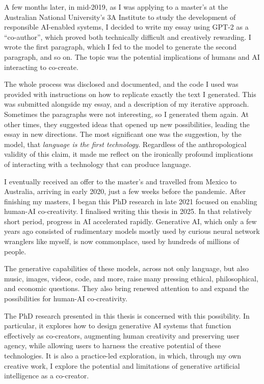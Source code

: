A few months later, in mid-2019, as I was applying to a master's at the Australian National University's 3A Institute to study the development of responsible AI-enabled systems, I decided to write my essay using GPT-2 as a ``co-author'', which proved both technically difficult and creatively rewarding. I wrote the first paragraph, which I fed to the model to generate the second paragraph, and so on. The topic was the potential implications of humans and AI interacting to co-create.

The whole process was disclosed and documented, and the code I used was provided with instructions on how to replicate exactly the text I generated. This was submitted alongside my essay, and a description of my iterative approach. Sometimes the paragraphs were not interesting, so I generated them again. At other times, they suggested ideas that opened up new possibilities, leading the essay in new directions. The most significant one was the suggestion, by the model, that \textit{language is the first technology}. Regardless of the anthropological validity of this claim, it made me reflect on the ironically profound implications of interacting with a technology that can produce language.

I eventually received an offer to the master's and travelled from Mexico to Australia, arriving in early 2020, just a few weeks before the pandemic. After finishing my masters, I began this PhD research in late 2021 focused on enabling human-AI co-creativity. I finalised writing this thesis in 2025. In that relatively short period, progress in AI accelerated rapidly. Generative AI, which only a few years ago consisted of rudimentary models mostly used by curious neural network wranglers like myself, is now commonplace, used by hundreds of millions of people.

The generative capabilities of these models, across not only language, but also music, images, videos, code, and more, raise many pressing ethical, philosophical, and economic questions. They also bring renewed attention to and expand the possibilities for human-AI co-creativity.

The PhD research presented in this thesis is concerned with this possibility. In particular, it explores how to design generative AI systems that function effectively as co-creators, augmenting human creativity and preserving user agency, while allowing users to harness the creative potential of these technologies. It is also a practice-led exploration, in which, through my own creative work, I explore the potential and limitations of generative artificial intelligence as a co-creator. 

